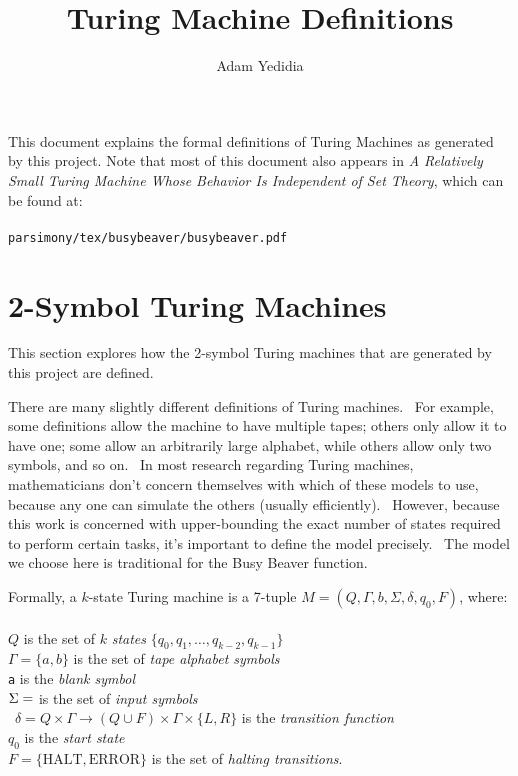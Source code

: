 \documentclass[11pt]{article}
\title{Turing Machine Definitions}
\author{Adam Yedidia}
\begin{document}
    
\maketitle

This document explains the formal definitions of Turing Machines as generated by this project. Note that most of this document also appears in \emph{A Relatively Small Turing Machine Whose Behavior Is Independent of Set Theory}, which can be found at: \\ \\
\texttt{parsimony/tex/busybeaver/busybeaver.pdf}

\section{2-Symbol Turing Machines}

This section explores how the 2-symbol Turing machines that are generated by this project are defined.

There are many slightly different definitions of Turing machines. \ For example, some definitions allow the machine to have multiple tapes; others only allow it to have one; some allow an arbitrarily large alphabet, while others allow only two symbols, and so on. \ In most research regarding Turing machines, mathematicians don't concern themselves with which of these models to use, because any one can simulate the others (usually efficiently). \ However, because this work is concerned with upper-bounding the exact number of states required to perform certain tasks, it's important to define the model precisely. \ The model we choose here is traditional for the Busy Beaver function.

Formally, a $k$-state Turing machine is a 7-tuple $M = (Q, \Gamma, b, \Sigma, \delta, q_0, F)$, where: \\ \\
$Q$ is the set of $k$ \emph{states} $\{q_0, q_1, \dots, q_{k-2}, q_{k-1}\}$ \\
$\Gamma = \{a, b\}$ is the set of \emph{tape alphabet symbols} \\
\texttt{a} is the \emph{blank symbol} \\
$\Sigma = \empty$ is the set of \emph{input symbols} \\\
$\delta = Q \times \Gamma \rightarrow (Q \cup F) \times \Gamma \times \{L, R\}$ is the \emph{transition function} \\
$q_0$ is the \emph{start state} \\
$F = \{\textrm{HALT}, \textrm{ERROR}\}$ is the set of \emph{halting transitions}. \\
\end{document}
